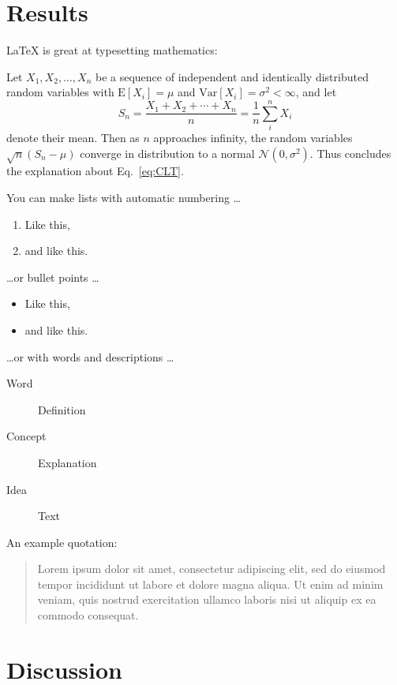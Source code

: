 \documentclass{biophys-new}
\begin{document}
\section*{Results}

\LaTeX{} is great at typesetting mathematics:

Let $X_1, X_2, \ldots, X_n$ be a sequence of independent and identically distributed random variables with $\text{E}[X_i] = \mu$ and $\text{Var}[X_i] = \sigma^2 < \infty$, and let
\begin{equation}
\label{eq:CLT}
S_n = \frac{X_1 + X_2 + \cdots + X_n}{n}
      = \frac{1}{n}\sum_{i}^{n} X_i
\end{equation}
denote their mean. Then as $n$ approaches infinity, the random variables $\sqrt{n}(S_n - \mu)$ converge in distribution to a normal $\mathcal{N}(0, \sigma^2)$. Thus concludes the explanation about Eq.~\ref{eq:CLT}.


You can make lists with automatic numbering \dots

\begin{enumerate}
\item Like this,
\item and like this.
\end{enumerate}

\dots or bullet points \dots

\begin{itemize} 
\item Like this,
\item and like this.
\end{itemize}

\dots or with words and descriptions \dots

\begin{description}
\item[Word] Definition
\item[Concept] Explanation
\item[Idea] Text
\end{description}

An example quotation:

\begin{quote}
Lorem ipsum dolor sit amet, consectetur adipiscing elit, sed do eiusmod tempor incididunt ut labore et dolore magna aliqua. Ut enim ad minim veniam, quis nostrud exercitation ullamco laboris nisi ut aliquip ex ea commodo consequat.
\end{quote}


\section*{Discussion}
\end{document}
